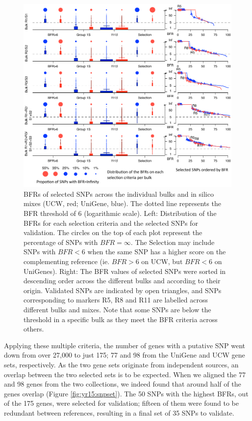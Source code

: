 \begin{figure}
\centering
\includegraphics[width=1\textwidth]{Yr15/Figures/selection/selectionDetals.pdf}
\caption[BFRs of selected SNPs across bulks.]{BFRs of selected SNPs across the individual bulks and in silico mixes (UCW, red; UniGene, blue). The dotted line represents the BFR threshold of 6 (logarithmic scale). Left: Distribution of the BFRs for each selection criteria and the selected SNPs for validation. The circles on the top of each plot represent the percentage of SNPs with $BFR=\infty$. The Selection may include SNPs with $BFR<6$ when the same SNP has a higher score on the complementing reference (ie. $BFR>6$ on UCW, but $BFR<6$ on UniGenes). Right: The BFR values of selected SNPs were sorted in descending order across the different bulks and according to their origin. Validated SNPs are indicated by open triangles, and SNPs corresponding to markers R5, R8 and R11 are labelled across different bulks and mixes. Note that some SNPs are below the threshold in a specific bulk as they meet the BFR criteria across others. }
\label{fig:yr15:bfrDetailScore}
\end{figure}

Applying these multiple criteria, the number of genes with a putative SNP went down from over 27,000 to just 175; 77 and 98 from the UniGene and UCW gene sets, respectively.
As the two gene sets originate from independent sources, an overlap between the two selected sets is to be expected.
When we aligned the 77 and 98 genes from the two collections, we indeed found that around half of the genes overlap (Figure \ref{fig:yr15:snpset}). 
The 50 SNPs with the highest BFRs, out of the 175 genes, were selected for validation; fifteen of them were found to be redundant between references, resulting in a final set of 35 SNPs to validate. 


